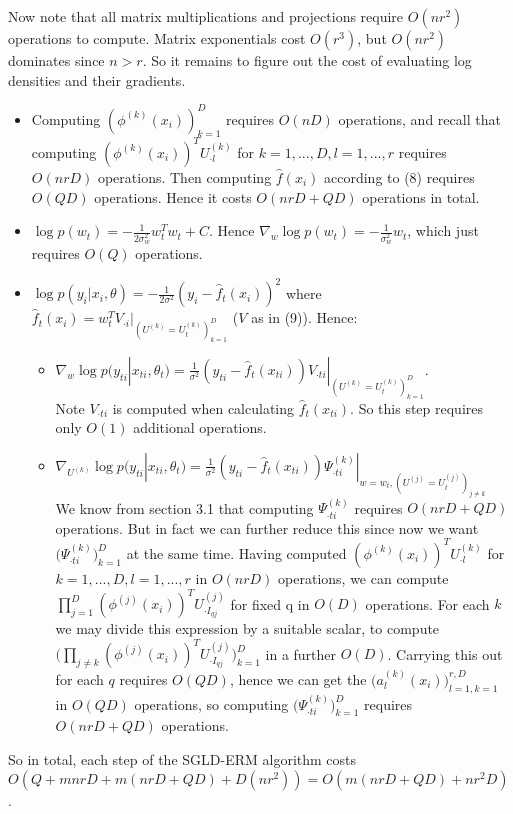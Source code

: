 \documentclass[a4paper,10pt]{article}
\begin{document}
Now note that all matrix multiplications and projections require $O(nr^2)$ operations to compute. Matrix exponentials cost $O(r^3)$, but $O(nr^2)$ dominates since $n>r$. So it remains to figure out the cost of evaluating log densities and their gradients.
\begin{itemize}
\item Computing $(\phi^{(k)}(x_i))_{k=1}^D $ requires $O(nD)$ operations, and recall that computing $(\phi^{(k)}(x_i))^T U^{(k)}_{\cdot l}$ for $k=1,...,D, l=1,...,r$ requires $O(nrD)$ operations. Then computing $\hat{f}(x_i)$ according to (8) requires $O(QD)$ operations. Hence it costs $O(nrD+QD)$ operations in total.
\item $\log p(w_t)=-\frac{1}{2\sigma_w^2}w_t^T w_t+C$. Hence $\nabla_w \log p(w_t) = -\frac{1}{\sigma_w^2}w_t$, which just requires $O(Q)$ operations.
\item $\log p(y_i|x_i,\theta)=-\frac{1}{2\sigma^2}(y_i-\hat{f}_t(x_i))^2$
 where $\hat{f}_t(x_i)=w_t^T V_{\cdot i}|_{(U^{(k)}=U_t^{(k)})_{k=1}^D}$ ($V$ as in (9)). Hence:
 \begin{itemize}
 \item $\nabla_w\log p(y_{ti}|x_{ti},\theta_t)=\frac{1}{\sigma^2}(y_{ti}-\hat{f}_t(x_{ti}))V_{\cdot ti}|_{(U^{(k)}=U_t^{(k)})_{k=1}^D}$. \\ 
 Note $V_{\cdot ti}$ is computed when calculating $\hat{f}_t(x_{ti})$. So this step requires only $O(1)$ additional operations.
 \item $\nabla_{U^{(k)}}\log p(y_{ti}|x_{ti},\theta_t)=\frac{1}{\sigma^2}(y_{ti}-\hat{f}_t(x_{ti}))\Psi_{\cdot ti}^{(k)}|_{w=w_t,(U^{(j)}=U_t^{(j)})_{j \neq k}}$ \\
 We know from section 3.1 that computing $\Psi_{\cdot ti}^{(k)}$ requires $O(nrD+QD)$ operations. But in fact we can further reduce this since now we want $\Big(\Psi_{\cdot ti}^{(k)}\Big)_{k=1}^D$ at the same time. Having computed $(\phi^{(k)}(x_i))^T U^{(k)}_{\cdot l}$ for $k=1,...,D, l=1,...,r$ in $O(nrD)$ operations, we can compute $\prod_{j=1}^D (\phi^{(j)}(x_i))^T U^{(j)}_{\cdot I_{qj}}$ for fixed q in $O(D)$ operations. For each $k$ we may divide this expression by a suitable scalar, to compute $\Big(\prod_{j \neq k} (\phi^{(j)}(x_i))^T U^{(j)}_{\cdot I_{qj}} \Big)_{k=1}^D$ in a further $O(D)$. Carrying this out for each $q$ requires $O(QD)$, hence we can get the $\bigg(a^{(k)}_l(x_i)\bigg)_{l=1,k=1}^{r,D}$ in $O(QD)$ operations, so computing $\Big(\Psi^{(k)}_{\cdot ti}\Big)_{k=1}^D$ requires $O(nrD+QD)$ operations.
 \end{itemize}
 \end{itemize}
 So in total, each step of the SGLD-ERM algorithm costs $O(Q+mnrD+m(nrD+QD)+D(nr^2))=O(m(nrD+QD)+nr^2D)$.
\end{document}

